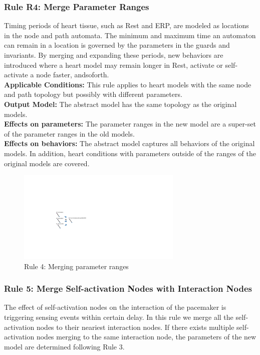 \subsubsection{Rule R4: Merge Parameter Ranges}
Timing periods of heart tissue, such as Rest and ERP, are modeled as locations in the node and path automata. 
The minimum and maximum time an automaton can remain in a location is governed by the parameters in the guards and invariants. 
By merging and expanding these periods, new behaviors are introduced where a heart model may remain longer in Rest, activate or self-activate a node faster, andsoforth.
\\
\textbf{Applicable Conditions: }
This rule applies to heart models with the same node and path topology but possibly with different parameters.\\
\textbf{Output Model: }The abstract model has the same topology as the original models.\\
\textbf{Effects on parameters:} The parameter ranges in the new model are a super-set of the parameter ranges in the old models.\\
\textbf{Effects on behaviors: }The abstract model captures all behaviors of the original models. In addition, heart conditions with parameters outside of the ranges of the original models are covered.
\begin{figure}[!h]
	\centering
	\includegraphics[width=0.7\textwidth]{figs/rule4.pdf}
	\caption{\small Rule 4: Merging parameter ranges}
	\label{fig:rule4}
\end{figure}
\subsubsection{Rule 5: Merge Self-activation Nodes with Interaction Nodes}
The effect of self-activation nodes on the interaction of the pacemaker is triggering sensing events within certain delay. In this rule we merge all the self-activation nodes to their neariest interaction nodes. If there exists multiple self-activation nodes merging to the same interaction node, the parameters of the new model are determined following Rule 3.

